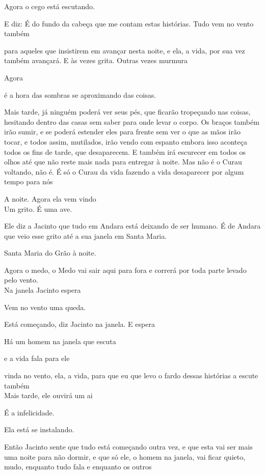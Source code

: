 Agora o cego está escutando.

E diz: É do fundo da cabeça que me contam estas histórias. Tudo vem no
vento também

para aqueles que insistirem em avançar nesta noite, e ela, a vida, por
sua vez também avançará. E às vezes grita. Outras vezes murmura

\breakk

\vspace*{4cm}

Agora

é a hora das sombras se aproximando das coisas.

Mais tarde, já ninguém poderá ver seus pés, que ficarão tropeçando nas
coisas, hesitando dentro das casas sem saber para onde levar o corpo. Os
braços também irão sumir, e se poderá estender eles para frente sem ver
o que as mãos irão tocar, e todos assim, mutilados, irão vendo com
espanto embora isso aconteça todos os fins de tarde, que desaparecem. E
também irá escurecer em todos os olhos até que não reste mais nada para
entregar à noite. Mas não é o Curau voltando, não é. É só o Curau da
vida fazendo a vida desaparecer por algum tempo para nós

A noite. Agora ela vem vindo\\

Um grito. É uma ave.

Ele diz a Jacinto que tudo em Andara está deixando de ser humano. É de
Andara que veio esse grito até a sua janela em Santa Maria.

Santa Maria do Grão à noite.

Agora o medo, o Medo vai sair aqui para fora e correrá por toda parte
levado pelo vento.\\

Na janela Jacinto espera

Vem no vento uma queda.

Está começando, diz Jacinto na janela. E espera

Há um homem na janela que escuta

e a vida fala para ele

vinda no vento, ela, a vida, para que eu que levo o fardo dessas
histórias a escute também\\

Mais tarde, ele ouvirá um ai

É a infelicidade.

Ela está se instalando.

Então Jacinto sente que tudo está começando outra vez, e que esta vai
ser mais uma noite para não dormir, e que só ele, o homem na janela, vai
ficar quieto, mudo, enquanto tudo fala e enquanto os outros

